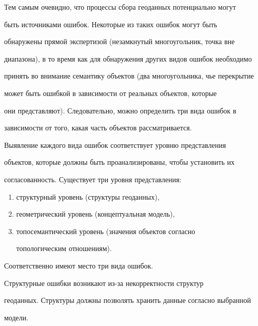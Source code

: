    Тем самым очевидно, что процессы сбора геоданных потенциально могут 


быть источниками ошибок. Некоторые из таких ошибок могут быть 


обнаружены прямой экспертизой (незамкнутый многоугольник, точка вне 


диапазона), в то время как для обнаружения других видов ошибок необходимо 


принять во внимание семантику объектов (два многоугольника, чье перекрытие 


может быть ошибкой в зависимости от реальных объектов, которые 


они представляют). Следовательно, можно определить три вида ошибок в 


зависимости от того, какая часть объектов рассматривается.


    


    Выявление каждого вида ошибок соответствует уровню представления 


объектов, которые должны быть проанализированы, чтобы установить их 


согласованность. Существует три уровня представления: 


    \begin{enumerate}[(1)]


\item структурный уровень (структуры геоданных), 


\item геометрический уровень (концептуальная модель), 


\item топосемантический уровень (значения объектов согласно 


топологическим отношениям). 


\end{enumerate}





Соответственно имеют место три вида ошибок. 


    


    Структурные ошибки возникают из-за некорректности структур 


геоданных. Структуры должны позволять хранить данные согласно выбранной 


модели.\linebreak\vspace*{-12pt}


